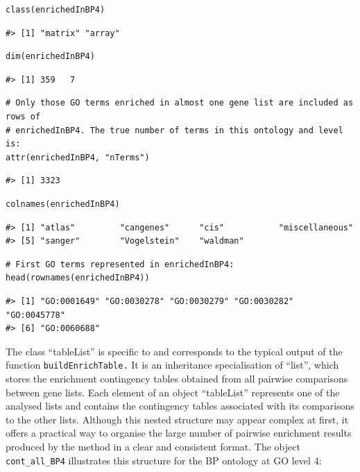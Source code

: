 \begin{verbatim}
class(enrichedInBP4)
\end{verbatim}

\begin{verbatim}
#> [1] "matrix" "array"
\end{verbatim}

\begin{verbatim}
dim(enrichedInBP4)
\end{verbatim}

\begin{verbatim}
#> [1] 359   7
\end{verbatim}

\begin{verbatim}
# Only those GO terms enriched in almost one gene list are included as rows of 
# enrichedInBP4. The true number of terms in this ontology and level is:
attr(enrichedInBP4, "nTerms")
\end{verbatim}

\begin{verbatim}
#> [1] 3323
\end{verbatim}

\begin{verbatim}
colnames(enrichedInBP4)
\end{verbatim}

\begin{verbatim}
#> [1] "atlas"         "cangenes"      "cis"           "miscellaneous"
#> [5] "sanger"        "Vogelstein"    "waldman"
\end{verbatim}

\begin{verbatim}
# First GO terms represented in enrichedInBP4:
head(rownames(enrichedInBP4))
\end{verbatim}

\begin{verbatim}
#> [1] "GO:0001649" "GO:0030278" "GO:0030279" "GO:0030282" "GO:0045778"
#> [6] "GO:0060688"
\end{verbatim}

The class ``tableList'' is specific to  and corresponds to the typical output of the function \texttt{buildEnrichTable.} It is an inheritance specialisation of ``list'', which stores the enrichment contingency tables obtained from all pairwise comparisons between gene lists. Each element of an object ``tableList'' represents one of the analysed lists and contains the contingency tables associated with its comparisons to the other lists. Although this nested structure may appear complex at first, it offers a practical way to organise the large number of pairwise enrichment results produced by the method in a clear and consistent format. The object \texttt{cont\_all\_BP4} illustrates this structure for the BP ontology at GO level 4:

